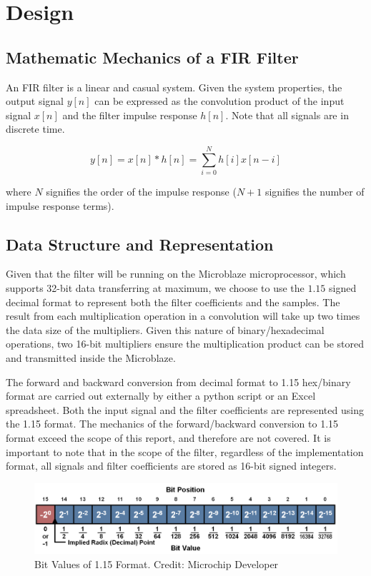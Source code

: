 \documentclass[conference]{IEEEtran}
\begin{document}
\section{Design} \label{design}

\subsection{Mathematic Mechanics of a FIR Filter} \label{mathematics_fir}
 An FIR filter is a linear and casual system. Given the system properties, the output signal $y[n]$ can be expressed as the convolution product of the input signal $x[n]$ and the filter impulse response $h[n]$. Note that all signals are in discrete time.

\begin{equation}
    \label{fir_conv}
    y[n] = x[n] * h[n] = \sum^N_{i=0} h[i]x[n-i]
\end{equation}

where $N$ signifies the order of the impulse response ($N+1$ signifies the number of impulse response terms).\cite{b1}

\subsection{Data Structure and Representation} \label{data_structure}

Given that the filter will be running on the Microblaze\textregistered{} microprocessor, which supports 32-bit data transferring at maximum, we choose to use the $1.15$ signed decimal format to represent both the filter coefficients and the samples. The result from each multiplication operation in a convolution will take up two times the data size of the multipliers. Given this nature of binary/hexadecimal operations, two 16-bit multipliers ensure the multiplication product can be stored and transmitted inside the Microblaze\textregistered{}.

The forward and backward conversion from decimal format to 1.15 hex/binary format are carried out externally by either a python script or an Excel spreadsheet. Both the input signal and the filter coefficients are represented using the 1.15 format. The mechanics of the forward/backward conversion to 1.15 format exceed the scope of this report, and therefore are not covered. It is important to note that in the scope of the filter, regardless of the implementation format, all signals and filter coefficients are stored as 16-bit signed integers. 

\begin{figure}[htbp]
\centerline{\includegraphics[width=\linewidth]{Figures/Filter/1-15.png}}
\caption{Bit Values of 1.15 Format. Credit: Microchip Developer}
\label{1-15}
\end{figure}
\end{document}
